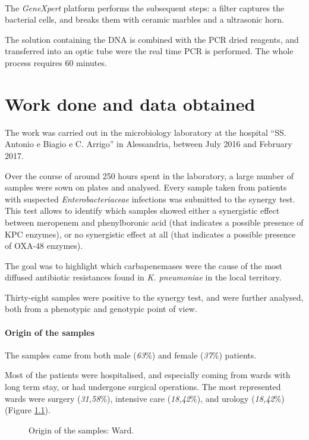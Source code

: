 \documentclass[11pt]{report}
\begin{document}
The \emph{GeneXpert\textsuperscript{\textregistered}} platform performs the subsequent steps: a filter captures the bacterial cells, and breaks them with ceramic marbles and a ultrasonic horn.

The solution containing the DNA is combined with the PCR dried reagents, and transferred into an optic tube were the real time PCR is performed.
The whole process requires 60 minutes.

\chapter{Work done and data obtained}

The work was carried out in the microbiology laboratory at the hospital ``SS. Antonio e Biagio e C. Arrigo'' in Alessandria, between July 2016 and February 2017.

Over the course of around 250 hours spent in the laboratory, a large number of samples were sown on plates and analysed.
Every sample taken from patients with suspected \emph{Enterobacteriaceae} infections was submitted to the synergy test.
This test allows to identify which samples showed either a synergistic effect between meropenem and phenylboronic acid (that indicates a possible presence of KPC enzymes), or no synergistic effect at all (that indicates a possible presence of OXA-48 enzymes).

The goal was to highlight which carbapenemases were the cause of the most diffused antibiotic resistances found in \emph{K. pneumoniae} in the local territory.

Thirty-eight samples were positive to the synergy test, and were further analysed, both from a phenotypic and genotypic point of view.

\clearpage

\subsubsection{Origin of the samples}

The samples came from both male (\emph{63$\%$}) and female (\emph{37$\%$}) patients.

Most of the patients were hospitalised, and especially coming from wards with long term stay, or had undergone surgical operations.
The most represented wards were surgery (\emph{31,58$\%$}), intensive care (\emph{18,42$\%$}), and urology (\emph{18,42$\%$}) (Figure \ref{wards}).

\begin{figure}[h!]
\centering
{}
\caption{Origin of the samples: Ward.}
\label{wards}
\end{figure}
\end{document}
